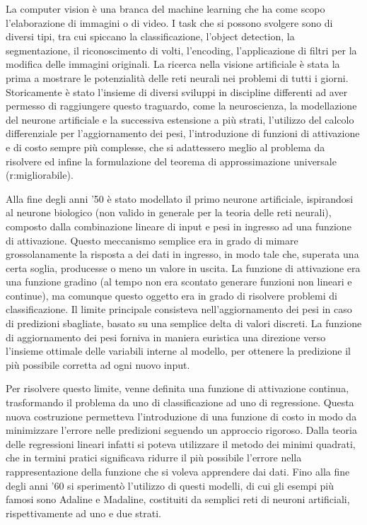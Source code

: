 \noindent La computer vision è una branca del machine learning che ha come scopo l'elaborazione di immagini o di video. I task che si possono svolgere sono di diversi tipi, tra cui spiccano la classificazione, l'object detection, la segmentazione, il riconoscimento di volti, l'encoding, l'applicazione di filtri per la modifica delle immagini originali. La ricerca nella visione artificiale è stata la prima a mostrare le potenzialità delle reti neurali nei problemi di tutti i giorni. Storicamente è stato l'insieme di diversi sviluppi in discipline differenti ad aver permesso di raggiungere questo traguardo, come la neuroscienza, la modellazione del neurone artificiale e la successiva estensione a più strati, l'utilizzo del calcolo differenziale per l'aggiornamento dei pesi, l'introduzione di funzioni di attivazione e di costo sempre più complesse, che si adattessero meglio al problema da risolvere ed infine la formulazione del teorema di approssimazione universale (r:migliorabile). 

\noindent Alla fine degli anni '50 è stato modellato il primo neurone artificiale, ispirandosi al neurone biologico (non valido in generale per la teoria delle reti neurali), composto dalla combinazione lineare di input e pesi in ingresso ad una funzione di attivazione. Questo meccanismo semplice era in grado di mimare grossolanamente la risposta a dei dati in ingresso, in modo tale che, superata una certa soglia, producesse o meno un valore in uscita. La funzione di attivazione era una funzione gradino (al tempo non era scontato generare funzioni non lineari e continue), ma comunque questo oggetto era in grado di risolvere problemi di classificazione. Il limite principale consisteva nell'aggiornamento dei pesi in caso di predizioni sbagliate, basato su una semplice delta di valori discreti. La funzione di aggiornamento dei pesi forniva in maniera euristica una direzione verso l'insieme ottimale delle variabili interne al modello, per ottenere la predizione il più possibile corretta ad ogni nuovo input. 

\noindent Per risolvere questo limite, venne definita una funzione di attivazione continua, trasformando il problema da uno di classificazione ad uno di regressione. Questa nuova costruzione permetteva l'introduzione di una funzione di costo in modo da minimizzare l'errore nelle predizioni seguendo un approccio rigoroso. Dalla teoria delle regressioni lineari infatti si poteva utilizzare il metodo dei minimi quadrati, che in termini pratici significava ridurre il più possibile l'errore nella rappresentazione della funzione che si voleva apprendere dai dati. Fino alla fine degli anni '60 si sperimentò l'utilizzo di questi modelli, di cui gli esempi più famosi sono Adaline e Madaline, costituiti da semplici reti di neuroni artificiali, rispettivamente ad uno e due strati. 

